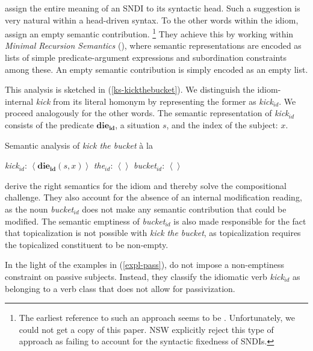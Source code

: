 \documentclass[output=paper]{langsci/langscibook}
\begin{document}
\cite{kaysagidioms} assign the entire meaning of an SNDI to its syntactic head. 
Such a suggestion is very natural within a head-driven syntax. 
To the other words within the idiom, \citet{kaysagidioms} assign an empty semantic contribution.%
\footnote{The earliest reference to such an approach seems to be \cite{Ruhl:75}. 
Unfortunately, we could not get a copy of this paper. 
NSW explicitly reject this type of approach as failing to account for the syntactic fixedness of SNDIs.}
They achieve this by working within  \emph{Minimal Recursion Semantics} (\citealt{Copestake:al:95,copestake2005mrs}), where semantic representations are encoded as lists of simple predicate-argument expressions and subordination constraints among these. 
An empty semantic contribution is simply encoded as an empty list.

This analysis is sketched in (\ref{ks-kickthebucket}). We distinguish the idiom-internal \textit{kick} from its literal homonym by representing the former as \textit{kick$_{id}$}. We proceed analogously for the other words. The semantic representation of \textit{kick$_{id}$} consists of the predicate $\mathbf{die_{id}}$, a situation $s$, and the index of the subject: $x$.

\begin{exe}
\ex Semantic analysis of \textit{kick the bucket} \`a la \cite{kaysagidioms}\label{ks-kickthebucket}
\begin{xlist}
\ex \textit{kick}$_{id}$: $\left< \mathbf{die_{id}}(s,x) \right>$
\ex \textit{the}$_{id}$: $\left<  \right>$
\ex \textit{bucket}$_{id}$: $\left<  \right>$
\end{xlist}
\end{exe}

\cite{kaysagidioms} derive the right semantics for the idiom and thereby solve the compositional challenge. They also account for the absence of an internal modification reading, as the noun \textit{bucket$_{id}$} does not make any semantic contribution that could be modified. The semantic emptiness of \textit{bucket$_{id}$} is also made responsible for the fact that  topicalization is not possible with \textit{kick the bucket}, as topicalization requires the topicalized constituent to be non-empty. 



\largerpage[-1]
In the  light of the examples in (\ref{expl-pass}), \cite{kaysagidioms} do not impose a non-emptiness constraint on passive subjects. Instead, they
classify the idiomatic verb \textit{kick$_{id}$} as belonging to a verb class that does not allow for passivization.
\end{document}
